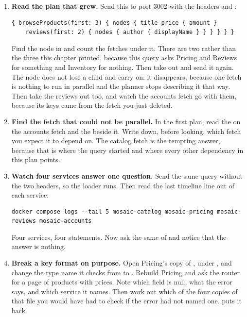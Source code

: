 \begin{enumerate}
  \item \textbf{Read the plan that grew.} Send this to port 3002 with the
  headers  and
  :

  \begin{verbatim}
{ browseProducts(first: 3) { nodes { title price { amount }
    reviews(first: 2) { nodes { author { displayName } } } } } }
  \end{verbatim}

  Find the  node in  and count the
  fetches under it. There are two rather than the three this chapter printed,
  because this query asks Pricing and Reviews for something and Inventory for
  nothing. Then take  out and send it again. The node does not lose
  a child and carry on: it disappears, because one fetch is nothing to run in
  parallel and the planner stops describing it that way. Then take the reviews
  out too, and watch the accounts fetch go with them, because its keys came from
  the fetch you just deleted.

  \item \textbf{Find the fetch that could not be parallel.} In the first plan,
  read the  on the accounts fetch and the 
  beside it. Write down, before looking, which fetch you expect it to depend on.
  The catalog fetch is the tempting answer, because that is where the query
  started and where every other dependency in this plan points.

  \item \textbf{Watch four services answer one question.} Send the same query
  without the two headers, so the loader runs. Then read the last timeline line
  out of each service:

  \begin{verbatim}
docker compose logs --tail 5 mosaic-catalog mosaic-pricing mosaic-reviews mosaic-accounts
  \end{verbatim}

  Four services, four statements. Now ask the same of
   and notice that the answer is nothing.

  \item \textbf{Break a key format on purpose.} Open Pricing's copy of
  , under , and change the type name it
  checks from  to . Rebuild Pricing and ask
  the router for a page of products with prices. Note which field is null, what
  the error says, and which service it names. Then work out which of the four
  copies of that file you would have had to check if the error had not named
  one.  puts it back.


\end{enumerate}
